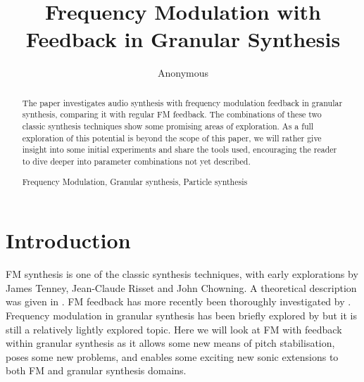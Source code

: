\documentclass[runningheads,a4paper]{llncs}
\newcommand{\keywords}[1]{\par\addvspace\baselineskip
\noindent\keywordname\enspace\ignorespaces#1}
\begin{document}
\mainmatter  %

\title{Frequency Modulation with Feedback in Granular Synthesis}





\author{Anonymous}

\maketitle

\begin{abstract}

The paper investigates audio synthesis with frequency modulation feedback in granular synthesis, comparing it with regular FM feedback. The combinations of these two classic synthesis techniques show some promising areas of exploration. As a full exploration of this potential is beyond the scope of this paper, we will rather give insight into some initial experiments and share the tools used, encouraging the reader to dive deeper into parameter combinations not yet described.

\keywords{Frequency Modulation, Granular synthesis, Particle synthesis}
\end{abstract}


\section{Introduction}
FM synthesis is one of the classic synthesis techniques, with early explorations by James Tenney, Jean-Claude Risset and John Chowning. A theoretical description was given in \cite{Chowning-73}. FM feedback has more recently been thoroughly investigated by \cite{Lazzarini-2024}. Frequency modulation in granular synthesis has been briefly explored by \cite{Ervik-Brandtsegg} but it is still a relatively lightly explored topic. Here we will look at FM with feedback within granular synthesis as it allows some new means of pitch stabilisation, poses some new problems, and enables some exciting new sonic extensions to both FM and granular synthesis domains.
\end{document}
